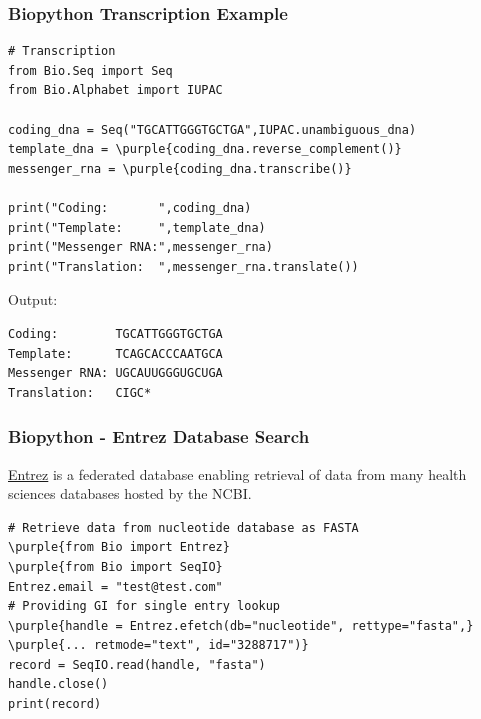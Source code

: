 \documentclass[xcolor=svgnames]{beamer}
\newcommand{\purple}[1]{{\textcolor{purple}{#1}}}
\newcommand{\ft}[1]{\frametitle{#1}}
\begin{document}
\begin{frame}[fragile]\ft{Biopython Transcription Example}
\begin{Verbatim}[commandchars=\\\{\}, fontsize=\small, frame=single]
# Transcription
from Bio.Seq import Seq
from Bio.Alphabet import IUPAC

coding_dna = Seq("TGCATTGGGTGCTGA",IUPAC.unambiguous_dna)
template_dna = \purple{coding_dna.reverse_complement()}
messenger_rna = \purple{coding_dna.transcribe()}

print("Coding:       ",coding_dna)
print("Template:     ",template_dna)
print("Messenger RNA:",messenger_rna)
print("Translation:  ",messenger_rna.translate())
\end{Verbatim}
Output:
\begin{Verbatim}[frame=single]
Coding:        TGCATTGGGTGCTGA
Template:      TCAGCACCCAATGCA
Messenger RNA: UGCAUUGGGUGCUGA
Translation:   CIGC*
\end{Verbatim}

\end{frame}


\begin{frame}[fragile]\ft{Biopython - Entrez Database Search}
\href{https://www.ncbi.nlm.nih.gov/Web/Search/entrezfs.html}{Entrez} is a federated database enabling retrieval of data from many  health sciences databases hosted by the NCBI.

\begin{Verbatim}[xleftmargin=.1in, fontsize=\small, commandchars=\\\{\}] 
# Retrieve data from nucleotide database as FASTA
\purple{from Bio import Entrez}
\purple{from Bio import SeqIO}
Entrez.email = "test@test.com"
# Providing GI for single entry lookup
\purple{handle = Entrez.efetch(db="nucleotide", rettype="fasta",} 
\purple{... retmode="text", id="3288717")}
record = SeqIO.read(handle, "fasta")
handle.close()
print(record)
\end{Verbatim}

\end{frame}
\end{document}
